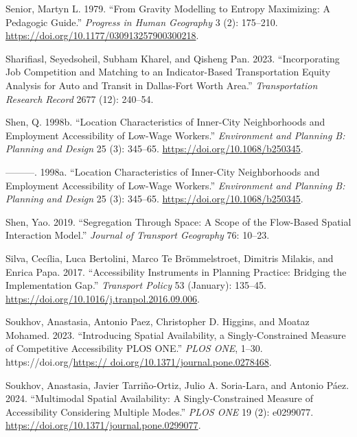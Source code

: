\documentclass[
]{article}
\newlength{\cslhangindent}
\newenvironment{CSLReferences}[2] %
 {\begin{list}{}{%
  \setlength{\itemindent}{0pt}
  \setlength{\leftmargin}{0pt}
  \setlength{\parsep}{0pt}
  \ifodd #1
   \setlength{\leftmargin}{\cslhangindent}
   \setlength{\itemindent}{-1\cslhangindent}
  \fi
  \setlength{\itemsep}{#2\baselineskip}}}
 {\end{list}}
\begin{document}
\begin{CSLReferences}{1}{0}
Senior, Martyn L. 1979. {``From Gravity Modelling to Entropy Maximizing:
A Pedagogic Guide.''} \emph{Progress in Human Geography} 3 (2):
175--210. \url{https://doi.org/10.1177/030913257900300218}.

Sharifiasl, Seyedsoheil, Subham Kharel, and Qisheng Pan. 2023.
{``Incorporating Job Competition and Matching to an Indicator-Based
Transportation Equity Analysis for Auto and Transit in Dallas-Fort Worth
Area.''} \emph{Transportation Research Record} 2677 (12): 240--54.

Shen, Q. 1998b. {``Location Characteristics of Inner-City Neighborhoods
and Employment Accessibility of Low-Wage Workers.''} \emph{Environment
and Planning B: Planning and Design} 25 (3): 345--65.
\url{https://doi.org/10.1068/b250345}.

---------. 1998a. {``Location Characteristics of Inner-City
Neighborhoods and Employment Accessibility of Low-Wage Workers.''}
\emph{Environment and Planning B: Planning and Design} 25 (3): 345--65.
\url{https://doi.org/10.1068/b250345}.

Shen, Yao. 2019. {``Segregation Through Space: A Scope of the Flow-Based
Spatial Interaction Model.''} \emph{Journal of Transport Geography} 76:
10--23.

Silva, Cecília, Luca Bertolini, Marco Te Brömmelstroet, Dimitris
Milakis, and Enrica Papa. 2017. {``Accessibility Instruments in Planning
Practice: Bridging the Implementation Gap.''} \emph{Transport Policy} 53
(January): 135--45. \url{https://doi.org/10.1016/j.tranpol.2016.09.006}.

Soukhov, Anastasia, Antonio Paez, Christopher D. Higgins, and Moataz
Mohamed. 2023. {``Introducing Spatial Availability, a Singly-Constrained
Measure of Competitive Accessibility {\textbar} {PLOS} {ONE}.''}
\emph{{PLOS} {ONE}}, 1--30.
https://doi.org/\href{https://\%20doi.org/10.1371/journal.pone.0278468}{https://
doi.org/10.1371/journal.pone.0278468}.

Soukhov, Anastasia, Javier Tarriño-Ortiz, Julio A. Soria-Lara, and
Antonio Páez. 2024. {``Multimodal Spatial Availability: A
Singly-Constrained Measure of Accessibility Considering Multiple
Modes.''} \emph{{PLOS} {ONE}} 19 (2): e0299077.
\url{https://doi.org/10.1371/journal.pone.0299077}.


\end{CSLReferences}
\end{document}
